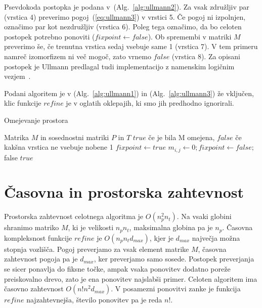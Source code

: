 \documentclass[a4paper, 12pt, ]{book}
\newcommand{\refalg}[1]{(Alg.~\ref{#1})}
\begin{document}
	Psevdokoda postopka je podana v~\refalg{alg:ullmann2}. Za vsak
	združljiv par (vrstica 4) preverimo pogoj~(\ref{eq:ullmann3}) v vrstici 5. Če pogoj ni izpolnjen, označimo par kot nezdružljiv (vrstica 6). Poleg tega
	označimo, da bo celoten postopek potrebno ponoviti ($fixpoint \gets false$). Ob spremembi v matriki $M$ preverimo še, če trenutna vrstica sedaj vsebuje
	same 1 (vrstica 7). V tem primeru namreč izomorfizem ni več mogoč, zato vrnemo $false$ (vrstica 8). Za opisani postopek je Ullmann predlagal tudi
	implementacijo z namenskim logičnim vezjem~\cite{ullmann}.

	Podani algoritem je v \refalg{alg:ullmann1} in \refalg{alg:ullmann3} že vključen, klic funkcije $refine$ je v oglatih oklepajih, ki smo jih predhodno
	ignorirali.

\begin{algorithm}
\caption{Omejevanje prostora}
\label{alg:ullmann2}
\begin{algorithmic}[1]
	\Require Matrika $M$ in sosednostni matriki $P$ in $T$
	\Ensure $true$ če je bila M omejena, $false$ če kakšna vrstica ne vsebuje nobene 1
		\Repeat
			\State $fixpoint \gets true$
					\State $m_{i,j} \gets 0; fixpoint \gets false;$
						\State \Return false
					\EndIf
				\EndIf
			\EndFor
		\State \Return $true$
	\EndProcedure
\end{algorithmic}
\end{algorithm}

	\section {Časovna in prostorska zahtevnost}
	Prostorska zahtevnost celotnega algoritma je $O(n_p^2 n_t)$. Na vsaki globini shranimo matriko $M$, ki je velikosti $n_p n_t$, maksimalna globina pa 
	je $n_p$. Časovna kompleksnost funkcije $refine$ je $O(n_p n_t d_{max})$, kjer je $d_{max}$ največja možna stopnja vozlišča. Pogoj preverjamo za
	vsak	element matrike $M$, časovna zahtevnost pogoja pa je $d_{max}$, ker preverjamo samo sosede. Postopek preverjanja se sicer ponavlja do fiksne
	točke, ampak vsaka ponovitev dodatno poreže preiskovalno drevo, zato je ena ponovitev najslabši primer. Celoten algoritem ima časovno zahtevnost
	$O(n! n^2 d_{max})$. V posamezni ponovitvi zanke je funkcija $refine$ najzahtevnejša, število ponovitev pa je reda $n!$.
\end{document}
